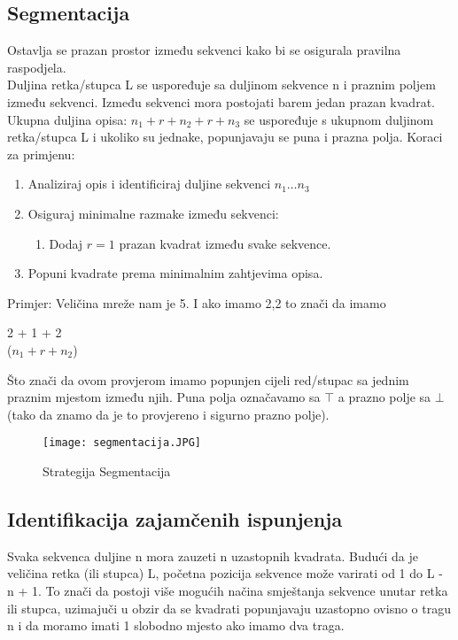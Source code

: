 \documentclass[a4paper,12pt]{article}
\begin{document}
\subsection{Segmentacija}
Ostavlja se prazan prostor između sekvenci kako bi se osigurala pravilna raspodjela.\\
Duljina retka/stupca L se uspoređuje sa duljinom sekvence n i praznim poljem između sekvenci. Između sekvenci mora postojati barem jedan prazan kvadrat.\\
Ukupna duljina opisa: $n_1 + r + n_2 + r + n_3$ se uspoređuje s ukupnom duljinom retka/stupca L i ukoliko su jednake, popunjavaju se puna i prazna polja.
\clearpage
Koraci za primjenu:
\begin{enumerate}
    \item Analiziraj opis i identificiraj duljine sekvenci $n_1 \dots n_3$
    \item Osiguraj minimalne razmake između sekvenci:
    \begin{enumerate}
        \item Dodaj $r = 1$ prazan kvadrat između svake sekvence.
    \end{enumerate}
    \item Popuni kvadrate prema minimalnim zahtjevima opisa.
\end{enumerate}
Primjer: Veličina mreže nam je 5. I ako imamo 2,2 to znači da imamo 
\begin{center}
2 + 1 + 2\\
($n_1 + r + n_2$)
\end{center}
Što znači da ovom provjerom imamo popunjen cijeli red/stupac sa jednim praznim mjestom između njih. Puna polja označavamo sa $\top$ a prazno polje sa $\bot$ (tako da znamo da je to provjereno i sigurno prazno polje).

\begin{figure}[h]
\centering
\texttt{[image: segmentacija.JPG]}
\caption{Strategija Segmentacija}
\end{figure}
\clearpage
\subsection{Identifikacija zajamčenih ispunjenja}
Svaka sekvenca duljine n mora zauzeti n uzastopnih kvadrata. Budući da je veličina retka (ili stupca) 
L, početna pozicija sekvence može varirati od 1 do L - n + 1. To znači da postoji više mogućih načina smještanja sekvence unutar retka ili stupca, uzimajuči u obzir da se kvadrati popunjavaju uzastopno ovisno o tragu n i da moramo imati 1 slobodno mjesto ako imamo dva traga.
\end{document}
